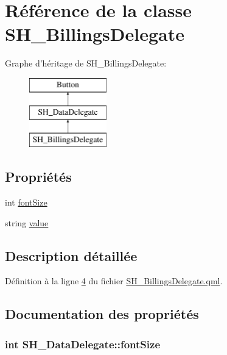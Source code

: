 \hypertarget{classSH__BillingsDelegate}{\section{Référence de la classe S\-H\-\_\-\-Billings\-Delegate}
\label{classSH__BillingsDelegate}
}
Graphe d'héritage de S\-H\-\_\-\-Billings\-Delegate\-:\begin{figure}[H]
\begin{center}
\leavevmode
\includegraphics[height=3.000000cm]{classSH__BillingsDelegate}
\end{center}
\end{figure}
\subsection*{Propriétés}
\begin{DoxyCompactItemize}
\item 
int \hyperlink{classSH__DataDelegate_afbb41ad9b513c7f27e7b5ad90d82e95b}{font\-Size}
\item 
string \hyperlink{classSH__DataDelegate_acb9da3c73493c88865e08d9575f26482}{value}
\end{DoxyCompactItemize}


\subsection{Description détaillée}


Définition à la ligne \hyperlink{SH__BillingsDelegate_8qml_source_l00004}{4} du fichier \hyperlink{SH__BillingsDelegate_8qml_source}{S\-H\-\_\-\-Billings\-Delegate.\-qml}.



\subsection{Documentation des propriétés}
\hypertarget{classSH__DataDelegate_afbb41ad9b513c7f27e7b5ad90d82e95b}{
\subsubsection[{font\-Size}]{\setlength{\rightskip}{0pt plus 5cm}int S\-H\-\_\-\-Data\-Delegate\-::font\-Size\hspace{0.3cm}{\ttfamily [inherited]}}}\label{classSH__DataDelegate_afbb41ad9b513c7f27e7b5ad90d82e95b}


